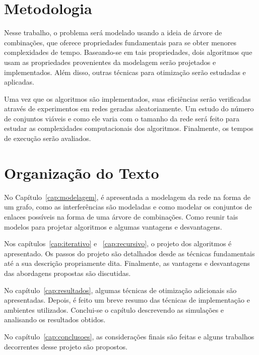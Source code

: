 \section{Metodologia}

Nesse trabalho, o problema será modelado usando a ideia de árvore de combinações, que oferece propriedades fundamentais para se obter menores complexidades de tempo. Baseando-se em tais propriedades, dois algoritmos que usam as propriedades provenientes da modelagem serão projetados e implementados. Além disso, outras técnicas para otimização serão estudadas e aplicadas.

Uma vez que os algoritmos são implementados, suas eficiências serão verificadas através de experimentos em redes geradas aleatoriamente. Um estudo do número de conjuntos viáveis e como ele varia com o tamanho da rede será feito para estudar as complexidades computacionais dos algoritmos. Finalmente, os tempos de execução serão avaliados.

\section{Organização do Texto}

No Capítulo~\ref{cap:modelagem}, é apresentada a modelagem da rede na forma de um grafo, como as interferências são modeladas e como modelar os conjuntos de enlaces possíveis na forma de uma árvore de combinações. Como reunir tais modelos para projetar algoritmos e algumas vantagens e desvantagens.

Nos capítulos~\ref{cap:iterativo} e ~\ref{cap:recursivo}, o projeto dos algoritmos é apresentado. Os passos do projeto são detalhados desde as técnicas fundamentais até a sua descrição propriamente dita. Finalmente, as vantagens e desvantagens das abordagens propostas são discutidas.

No capítulo~\ref{cap:resultados}, algumas técnicas de otimização adicionais são apresentadas. Depois, é feito um breve resumo das técnicas de implementação e ambientes utilizados. Conclui-se o capítulo descrevendo as simulações e analisando os resultados obtidos.

No capítulo~\ref{cap:conclusoes}, as considerações finais são feitas e alguns trabalhos decorrentes desse projeto são propostos.


